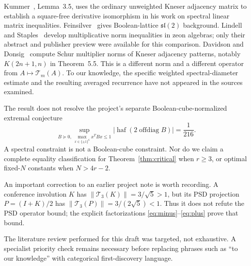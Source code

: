 \documentclass[11pt]{article}
\theoremstyle{remark}\newtheorem{remark}[theorem]{Remark}
\DeclareMathOperator{\haf}{haf}\DeclareMathOperator{\tr}{tr}
\begin{document}
Kummer~\cite{kummer}, Lemma~3.5, uses the ordinary unweighted Kneser adjacency
matrix to establish a square-free derivative isomorphism in his work on
spectral linear matrix inequalities.  Feinsilver~\cite{feinsilver} gives
Boolean-lattice $\mathfrak{sl}(2)$ background.  Lindell and Staples~\cite{lindell}
develop multiplicative norm inequalities in zeon algebras; only their
abstract and publisher preview were available for this comparison. Davidson
and Donsig~\cite{davidson} compute Schur multiplier norms of Kneser adjacency
patterns, notably $K(2n+1,n)$ in Theorem~5.5. This is a different norm and
a different operator from $A\mapsto\mathcal T_m(A)$. To our knowledge, the
specific weighted spectral-diameter estimate and the resulting averaged
recurrence have not appeared in the sources examined.

The result does not resolve the project's separate Boolean-cube-normalized
extremal conjecture
\[
\sup_{B\succeq0,\ \max_{x\in\{\pm1\}^6}x^TBx\le1}
|\haf(2\operatorname{offdiag}B)|=\frac1{216}.
\]
A spectral constraint is not a Boolean-cube constraint.  Nor do we claim a
complete equality classification for Theorem~\ref{thm:critical} when $r\ge3$,
or optimal fixed-$N$ constants when $N>4r-2$.

An important correction to an earlier project note is worth recording.  A
conference involution $K$ has $\|\mathcal T_3(K)\|=3/\sqrt5>1$, but its PSD
projection $P=(I+K)/2$ has
$\|\mathcal T_3(P)\|=3/(2\sqrt5)<1$.  Thus it does not refute the PSD operator
bound; the explicit factorizations \eqref{eq:minus}--\eqref{eq:plus} prove that
bound.

The literature review performed for this draft was targeted, not exhaustive.
A specialist priority check remains necessary before replacing phrases such as
``to our knowledge'' with categorical first-discovery language.
\end{document}
